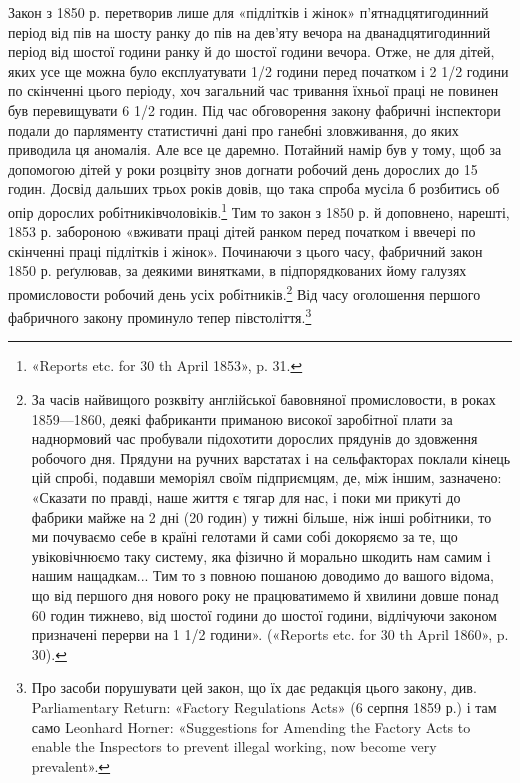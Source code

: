 Закон з 1850 р. перетворив лише для «підлітків і жінок»
п’ятнадцятигодинний період від пів на шосту ранку до пів на
дев’яту вечора на дванадцятигодинний період від шостої години
ранку й до шостої години вечора. Отже, не для дітей, яких усе
ще можна було експлуатувати 1/2 години перед початком і 2 1/2
години по скінченні цього періоду, хоч загальний час тривання
їхньої праці не повинен був перевищувати 6 1/2 годин. Під час обговорення
закону фабричні інспектори подали до парляменту статистичні
дані про ганебні зловживання, до яких приводила ця
аномалія. Але все це даремно. Потайний намір був у тому, щоб
за допомогою дітей у роки розцвіту знов догнати робочий день
дорослих до 15 годин. Досвід дальших трьох років довів, що
така спроба мусіла б розбитись об опір дорослих робітниківчоловіків.\footnote{
«Reports etc. for 30 th April 1853», p. 31.
}
Тим то закон з 1850 р. й доповнено, нарешті, 1853 р.
забороною «вживати праці дітей ранком перед початком і ввечері
по скінченні праці підлітків і жінок». Починаючи з цього часу,
фабричний закон 1850 р. реґулював, за деякими винятками, в
підпорядкованих йому галузях промисловости робочий день усіх
робітників.\footnote{
За часів найвищого розквіту англійської бавовняної промисловости,
в роках 1859—1860, деякі фабриканти приманою високої заробітної
плати за наднормовий час пробували підохотити дорослих прядунів до
здовження робочого дня. Прядуни на ручних варстатах і на сельфакторах
поклали кінець цій спробі, подавши меморіял своїм підприємцям, де, між
іншим, зазначено: «Сказати по правді, наше життя є тягар для нас, і
поки ми прикуті до фабрики майже на 2 дні (20 годин) у тижні
більше, ніж інші робітники, то ми почуваємо себе в країні гелотами й
сами собі докоряємо за те, що увіковічнюємо таку систему, яка фізично
й морально шкодить нам самим і нашим нащадкам... Тим то з повною
пошаною доводимо до вашого відома, що від першого дня нового року
не працюватимемо й хвилини довше понад 60 годин тижнево, від шостої
години до шостої години, відлічуючи законом призначені перерви на
1 1/2 години». («Reports etc. for 30 th April 1860», p. 30).
} Від часу оголошення першого фабричного закону
проминуло тепер півстоліття.\footnote{
Про засоби порушувати цей закон, що їх дає редакція цього закону,
див. Parliamentary Return: «Factory Regulations Acts» (6 серпня 1859 р.) і
там само Leonhard Horner: «Suggestions for Amending the Factory Acts to
enable the Inspectors to prevent illegal working, now become very prevalent».
}

